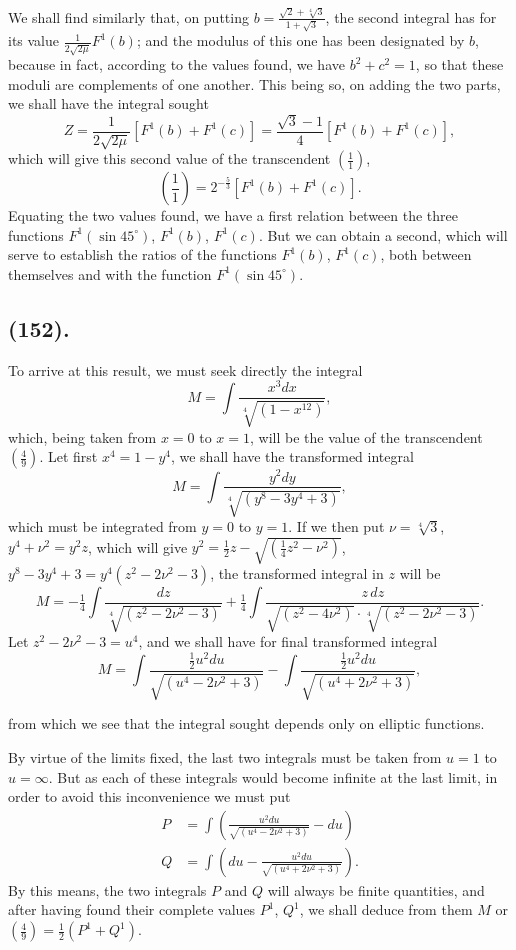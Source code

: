\documentclass{article}
\begin{document}

We shall find similarly that, on putting $b=\frac{\sqrt{2}+\sqrt[4]{3}}{1+\sqrt{3}}$, the second integral has for its value $\frac{1}{2\sqrt{2\mu}}F^{1}(b)$; and the modulus of this one has been designated by $b$, because in fact, according to the values found, we have $b^{2}+c^{2}=1$, so that these moduli are complements of one another. This being so, on adding the two parts, we shall have the integral sought
\[ Z=\frac{1}{2\sqrt{2\mu}}[F^{1}(b)+F^{1}(c)]=\frac{\sqrt{3}-1}{4}[F^{1}(b)+F^{1}(c)], \]
which will give this second value of the transcendent $\left(\frac{1}{1}\right)$,
\[ \left(\frac{1}{1}\right)=2^{-\frac{5}{3}}[F^{1}(b)+F^{1}(c)]. \]
Equating the two values found, we have a first relation between the three functions $F^{1}(\sin 45^{\circ})$, $F^{1}(b)$, $F^{1}(c)$. But we can obtain a second, which will serve to establish the ratios of the functions $F^{1}(b)$, $F^{1}(c)$, both between themselves and with the function $F^{1}(\sin 45^{\circ})$.

\subsection*{(152).}

To arrive at this result, we must seek directly the integral
\[ M=\int\frac{x^{3}dx}{\sqrt[4]{(1-x^{12})}}, \]
which, being taken from $x=0$ to $x=1$, will be the value of the transcendent $\left(\frac{4}{9}\right)$. Let first $x^{4}=1-y^{4}$, we shall have the transformed integral
\[ M=\int\frac{y^{2}dy}{\sqrt[4]{(y^{8}-3y^{4}+3)}}, \]
which must be integrated from $y=0$ to $y=1$. If we then put $\nu=\sqrt[4]{3}$, $y^{4}+\nu^{2}=y^{2}z$, which will give $y^{2}=\frac{1}{2}z-\sqrt{(\frac{1}{4}z^{2}-\nu^{2})}$, $y^{8}-3y^{4}+3=y^{4}(z^{2}-2\nu^{2}-3)$, the transformed integral in $z$ will be
\[ M=-\tfrac{1}{4}\int\frac{dz}{\sqrt[4]{(z^{2}-2\nu^{2}-3)}}+\tfrac{1}{4}\int\frac{z\,dz}{\sqrt{(z^{2}-4\nu^{2})}\cdot\sqrt[4]{(z^{2}-2\nu^{2}-3)}}. \]
Let $z^{2}-2\nu^{2}-3=u^{4}$, and we shall have for final transformed integral
\[ M=\int\frac{\tfrac{1}{2}u^{2}du}{\sqrt{(u^{4}-2\nu^{2}+3)}}-\int\frac{\tfrac{1}{2}u^{2}du}{\sqrt{(u^{4}+2\nu^{2}+3)}}, \]

from which we see that the integral sought depends only on elliptic functions.

By virtue of the limits fixed, the last two integrals must be taken from $u=1$ to $u=\infty$. But as each of these integrals would become infinite at the last limit, in order to avoid this inconvenience we must put
\[ \begin{aligned} P&=\int\left(\frac{u^{2}du}{\sqrt{(u^{4}-2\nu^{2}+3)}}-du\right)\\ Q&=\int\left(du-\frac{u^{2}du}{\sqrt{(u^{4}+2\nu^{2}+3)}}\right). \end{aligned} \]
By this means, the two integrals $P$ and $Q$ will always be finite quantities, and after having found their complete values $P^{1}$, $Q^{1}$, we shall deduce from them $M$ or $\left(\frac{4}{9}\right)=\frac{1}{2}(P^{1}+Q^{1})$.
\end{document}
